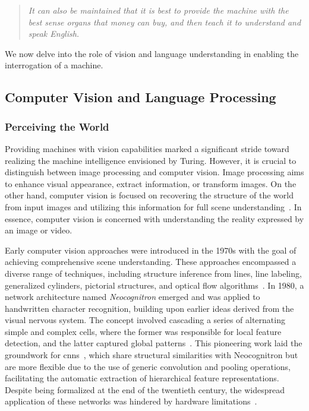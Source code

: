 \begin{quote}
    \textit{It can also be maintained that it is best to provide the machine with the best sense organs that money can buy, and then teach it to understand and speak English.}
\end{quote}

We now delve into the role of vision and language understanding in enabling the interrogation of a machine.

\subsection{Computer Vision and Language Processing}

\subsubsection{Perceiving the World}
Providing machines with vision capabilities marked a significant stride toward realizing the machine intelligence envisioned by Turing. However, it is crucial to distinguish between image processing and computer vision. Image processing aims to enhance visual appearance, extract information, or transform images. On the other hand, computer vision is focused on recovering the  structure of the world from input images and utilizing this information for full scene understanding~\cite{szeliski2022computer}. In essence, computer vision is concerned with understanding the reality expressed by an image or video. 

Early computer vision approaches were introduced in the 1970s with the goal of achieving comprehensive scene understanding. These approaches encompassed a diverse range of techniques, including  structure inference from  lines, line labeling, generalized cylinders, pictorial structures, and optical flow algorithms~\cite{szeliski2022computer}. In 1980, a network architecture named \textit{Neocognitron} emerged and was applied to handwritten character recognition, building upon earlier ideas derived from the visual nervous system. The concept involved cascading a series of alternating simple and complex cells, where the former was responsible for local feature detection, and the latter captured global patterns~\cite{fukushima1980neocognitron}. This pioneering work laid the groundwork for \glspl{cnn}~\cite{lecun1998gradient}, which share structural similarities with Neocognitron but are more flexible due to the use of generic convolution and pooling operations, facilitating the automatic extraction of hierarchical feature representations. Despite being formalized at the end of the twentieth century, the widespread application of these networks was hindered by hardware limitations~\cite{krizhevsky2012imagenet}. 

